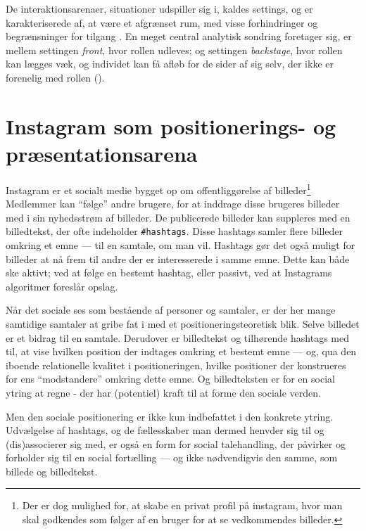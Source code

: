 De interaktionsarenaer, situationer udspiller sig i, kaldes 
settings, og er karakteriserede af, at være et afgrænset rum, med 
visse forhindringer og begrænsninger for tilgang \autocite[s.  
???]{goffmanPresentationSelfEveryday1956}. En meget central 
analytisk sondring 
\citeauthor{goffmanPresentationSelfEveryday1956} foretager sig, er
mellem settingen \emph{front}, hvor rollen udleves; og settingen 
\emph{backstage}, hvor rollen kan lægges væk, og individet kan få 
afløb for de sider af sig selv, der ikke er forenelig med rollen 
(\citeyear[s. ???]{goffmanPresentationSelfEveryday1956}).

\section{Instagram som positionerings- og præsentationsarena}
Instagram er et socialt medie bygget op om offentliggørelse af 
billeder\footnote{Der er dog mulighed for, at skabe en privat 
profil på instagram, hvor man skal godkendes som følger af en 
bruger for at se vedkommendes billeder.} Medlemmer kan “følge” 
andre brugere, for at inddrage disse brugeres billeder med i sin 
nyhedsstrøm af billeder. De publicerede billeder kan suppleres med 
en billedtekst, der ofte indeholder \texttt{\#hashtags}. Disse 
hashtags samler flere billeder omkring et emne — til en samtale, 
om man vil. Hashtags gør det også muligt for billeder at nå frem 
til andre der er interesserede i samme emne. Dette kan både ske 
aktivt; ved at følge en bestemt hashtag, eller passivt, ved at 
Instagrams algoritmer foreslår opslag.

Når det sociale ses som bestående af personer og samtaler, er der 
her mange samtidige samtaler at gribe fat i med et 
positioneringsteoretisk blik. Selve billedet er et bidrag til en 
samtale. Derudover er billedtekst og tilhørende hashtags med til, 
at vise hvilken position der indtages omkring et bestemt emne — 
og, qua den iboende relationelle kvalitet i positioneringen, 
hvilke positioner der konstrueres for ens “modstandere” omkring 
dette emne. Og billedteksten er for en social ytring at regne - 
der har (potentiel) kraft til at forme den sociale verden.

Men den sociale positionering er ikke kun indbefattet i den 
konkrete ytring. Udvælgelse af hashtags, og de fællesskaber man 
dermed henvder sig til og (dis)associerer sig med, er også en form 
for social talehandling, der påvirker og forholder sig til en 
social fortælling — og ikke nødvendigvis den samme, som billede og 
billedtekst.

